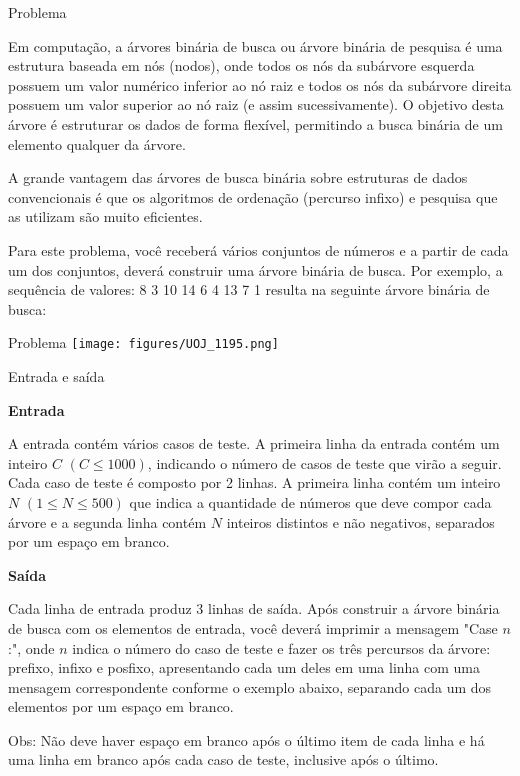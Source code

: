 
\begin{frame}[fragile]{Problema}

Em computação, a árvores binária de busca ou árvore binária de pesquisa é uma estrutura baseada em nós (nodos), onde todos os nós da subárvore esquerda possuem um valor numérico inferior ao nó raiz e todos os nós da subárvore direita possuem um valor superior ao nó raiz (e assim sucessivamente). O objetivo desta árvore é estruturar os dados de forma flexível, permitindo a busca binária de um elemento qualquer da árvore.

A grande vantagem das árvores de busca binária sobre estruturas de dados convencionais é que os algoritmos de ordenação (percurso infixo) e pesquisa que as utilizam são muito eficientes.

Para este problema, você receberá vários conjuntos de números e a partir de cada um dos conjuntos, deverá construir uma árvore binária de busca. Por exemplo, a sequência de valores: 8 3 10 14 6 4 13 7 1 resulta na seguinte árvore binária de busca:

\end{frame}


\begin{frame}[fragile]{Problema}
    \texttt{[image: figures/UOJ\_1195.png]}
\end{frame}

\begin{frame}[fragile]{Entrada e saída}

\textbf{Entrada}

A entrada contém vários casos de teste. A primeira linha da entrada contém um inteiro $C$ $(C \leq 1000)$, indicando o número de casos de teste que virão a seguir. Cada caso de teste é composto por 2 linhas. A primeira linha contém um inteiro $N$ $(1 \leq N \leq 500)$ que indica a quantidade de números que deve compor cada árvore e a segunda linha contém $N$ inteiros distintos e não negativos, separados por um espaço em branco.

\textbf{Saída}

Cada linha de entrada produz 3 linhas de saída. Após construir a árvore binária de busca com os elementos de entrada, você deverá imprimir a mensagem "Case $n$:", onde $n$ indica o número do caso de teste e fazer os três percursos da árvore: prefixo, infixo e posfixo, apresentando cada um deles em uma linha com uma mensagem correspondente conforme o exemplo abaixo, separando cada um dos elementos por um espaço em branco. 

Obs: Não deve haver espaço em branco após o último item de cada linha e há uma linha em branco após cada caso de teste, inclusive após o último.

\end{frame}

